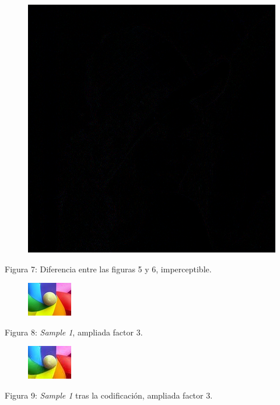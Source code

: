 \documentclass[%
final,
%
reprint,
%
notitlepage,
narroweqnarray,
inline,
twoside,
invited
]{ieee}
\begin{document}
\begin{figure}[H]
	\begin{center}
	\includegraphics[scale=0.7]{./img/lenadif.png}
	\end{center}
\end{figure}
\begin{center}
\par Figura 7: Diferencia entre las figuras 5 y 6, imperceptible.
\end{center}

\begin{figure}[H]
	\begin{center}
	\includegraphics[scale=3]{./img/sample_1_in.jpg}
	\end{center}
\end{figure}
\begin{center}
\par Figura 8: \textit{Sample 1}, ampliada factor 3.
\end{center}

\begin{figure}[H]
	\begin{center}
	\includegraphics[scale=3]{./img/sample_1_alpha_1_out.jpg}
	\end{center}
\end{figure}
\begin{center}
\par Figura 9: \textit{Sample 1} tras la codificación, ampliada factor 3.
\end{center}
\end{document}
